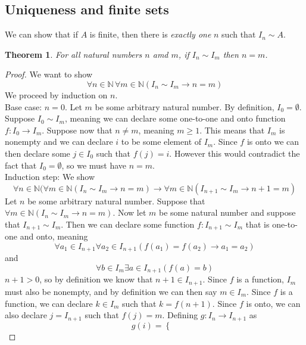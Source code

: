 \documentclass{report}
\newtheorem*{theorem}{Theorem}
\theoremstyle{definition}
\begin{document}
\subsection{Uniqueness and finite sets}
We can show that if $A$ is finite, then there is \textit{exactly one} $n$ such that $I_n\sim A$.
\begin{theorem}
For all natural numbers $n$ amd $m$, if $I_n\sim I_m$ then $n=m$.
\end{theorem}
\begin{proof}
We want to show
\begin{equation*}
\forall n\in\mathbb N\,\forall m\in\mathbb N(I_n\sim I_m\to n=m)
\end{equation*}
We proceed by induction on $n$.\\
\indent Base case: $n=0$. 
Let $m$ be some arbitrary natural number. By definition, $I_0=\emptyset$. Suppose $I_0\sim I_m$, meaning we can declare some one-to-one and onto function $f:I_0\to I_m$. 
Suppose now that
$n\neq m$, meaning $m\geq1$. This means that $I_m$ is nonempty and we can declare $i$ to be some element of $I_m$.
Since $f$ is onto we can then declare some $j\in I_0$ such that $f(j)=i$. However this would contradict
the fact that $I_0=\emptyset$, so we must have $n=m$.\\
\indent Induction step: We show
\begin{equation*}
\forall n\in\mathbb N(\forall m\in\mathbb N(I_n\sim I_m\to n=m)\to\forall m\in\mathbb N(I_{n+1}\sim I_m\to n+1=m)
\end{equation*}
Let $n$ be some arbitrary natural number. Suppose that $\forall m\in\mathbb N(I_n\sim I_m\to n=m)$. Now let 
$m$ be some natural number and suppose that $I_{n+1}\sim I_m$. Then we can declare some function $f:I_{n+1}\sim I_m$
that is one-to-one and onto, meaning
\begin{equation*}
\forall a_1\in I_{n+1}\forall a_2\in I_{n+1}
(f(a_1)=f(a_2)\to a_1=a_2)
\end{equation*}
and 
\begin{equation*}
\forall b\in I_m\exists a\in I_{n+1}(f(a)=b)
\end{equation*}
$n+1>0$, so by definition we know that $n+1\in I_{n+1}$. Since $f$ is a function, $I_m$ must also be nonempty, 
and by definition we can then say $m\in I_m$. Since $f$ is a function, we can declare $k\in I_m$ such that 
$k=f(n+1)$. Since $f$ is onto, we can also declare $j=I_{n+1}$ such that $f(j)=m$. Defining $g:I_n\to I_{n+1}$ as
\begin{equation*}
g(i)=\begin{cases}

\end{cases}
\end{equation*}
\end{proof}
\end{document}
